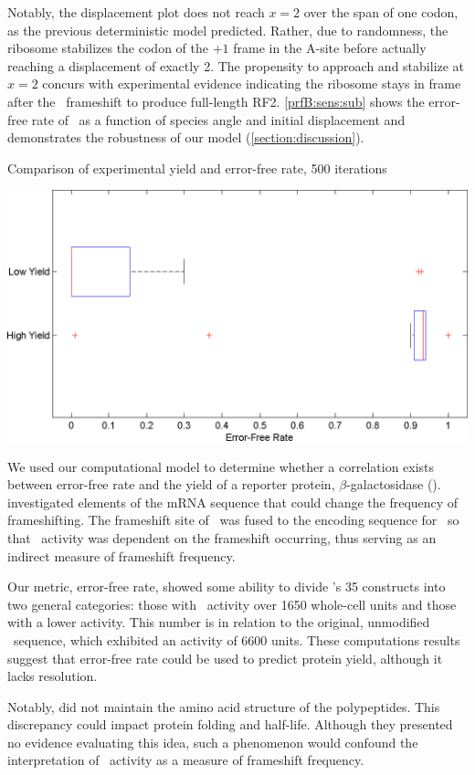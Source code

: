 \documentclass[11pt]{article}
\begin{document}
Notably, the displacement plot does not reach $x=2$ over the span of
one codon, as the previous deterministic model predicted.  Rather, due to randomness, the
ribosome stabilizes the codon of the $+1$ frame in the A-site before actually reaching
a displacement of exactly 2.  The propensity to approach and stabilize at $x=2$
concurs with experimental evidence indicating the ribosome
stays in frame after the \prfB\ frameshift to produce full-length RF2.
\autoref{prfB:sens:sub} shows the error-free rate of \prfB\ as a function
of species angle and initial displacement and demonstrates the
robustness of our model (\autoref{section:discussion}).

\begin{cfigure}
  \caption{Comparison of experimental yield and error-free rate, 500 iterations}
  \label{weissboxplot}
  \includegraphics[width=0.5\linewidth]{histograms/weissbox}
\end{cfigure}

We used our computational model to determine whether a correlation exists between 
error-free rate and the yield of a reporter protein, $\beta$-galactosidase (\bgals).  
\citet{weiss87} investigated elements of the mRNA sequence that could change the frequency 
of frameshifting.  The frameshift site of \prfB\ was fused to the encoding sequence for 
\bgals\ so that \bgals\ activity was dependent on the frameshift occurring, 
thus serving as an indirect measure of frameshift frequency.  

Our metric, error-free rate, showed some ability to divide \citeauthor{weiss87}'s 35 constructs into 
two general categories: those with \bgals\ activity over 1650 whole-cell units and those with a 
lower activity.  This number is in relation to the original, unmodified \prfB\ sequence, 
which exhibited an activity of 6600 units.  These computations results suggest that 
error-free rate could be used to predict protein yield, although it lacks resolution.

Notably, \citeauthor{weiss87} did not maintain the amino acid structure of the polypeptides.  
This discrepancy could impact protein folding and half-life.  Although they
presented no evidence evaluating this idea, such a phenomenon would confound the interpretation 
of \bgals\ activity as a measure of frameshift frequency.
\end{document}
